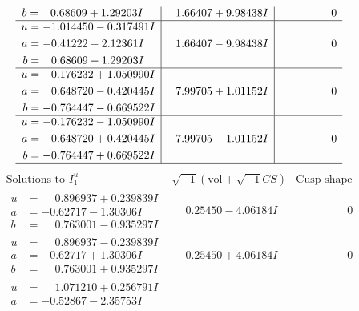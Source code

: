 \documentclass[1p]{elsarticle_modified}
\theoremstyle{definition}
\newcommand{\I}{\sqrt{-1}}
\begin{document}
$$\begin{array}{c|c|c}
\begin{aligned}
b &= \phantom{-}0.68609 + 1.29203 I\end{aligned}
 & \phantom{-}1.66407 + 9.98438 I & \phantom{-0.000000 } 0 \\ \hline\begin{aligned}
u &= -1.014450 - 0.317491 I \\
a &= -0.41222 - 2.12361 I \\
b &= \phantom{-}0.68609 - 1.29203 I\end{aligned}
 & \phantom{-}1.66407 - 9.98438 I & \phantom{-0.000000 } 0 \\ \hline\begin{aligned}
u &= -0.176232 + 1.050990 I \\
a &= \phantom{-}0.648720 - 0.420445 I \\
b &= -0.764447 - 0.669522 I\end{aligned}
 & \phantom{-}7.99705 + 1.01152 I & \phantom{-0.000000 } 0 \\ \hline\begin{aligned}
u &= -0.176232 - 1.050990 I \\
a &= \phantom{-}0.648720 + 0.420445 I \\
b &= -0.764447 + 0.669522 I\end{aligned}
 & \phantom{-}7.99705 - 1.01152 I & \phantom{-0.000000 } 0\\
 \hline 
 \end{array}$$\newpage$$\begin{array}{c|c|c}  
\text{Solutions to }I^u_{1}& \I (\text{vol} + \sqrt{-1}CS) & \text{Cusp shape}\\
 \hline 
\begin{aligned}
u &= \phantom{-}0.896937 + 0.239839 I \\
a &= -0.62717 - 1.30306 I \\
b &= \phantom{-}0.763001 - 0.935297 I\end{aligned}
 & \phantom{-}0.25450 - 4.06184 I & \phantom{-0.000000 } 0 \\ \hline\begin{aligned}
u &= \phantom{-}0.896937 - 0.239839 I \\
a &= -0.62717 + 1.30306 I \\
b &= \phantom{-}0.763001 + 0.935297 I\end{aligned}
 & \phantom{-}0.25450 + 4.06184 I & \phantom{-0.000000 } 0 \\ \hline\begin{aligned}
u &= \phantom{-}1.071210 + 0.256791 I \\
a &= -0.52867 - 2.35753 I \\

\end{aligned}
\end{array}$$
\end{document}
